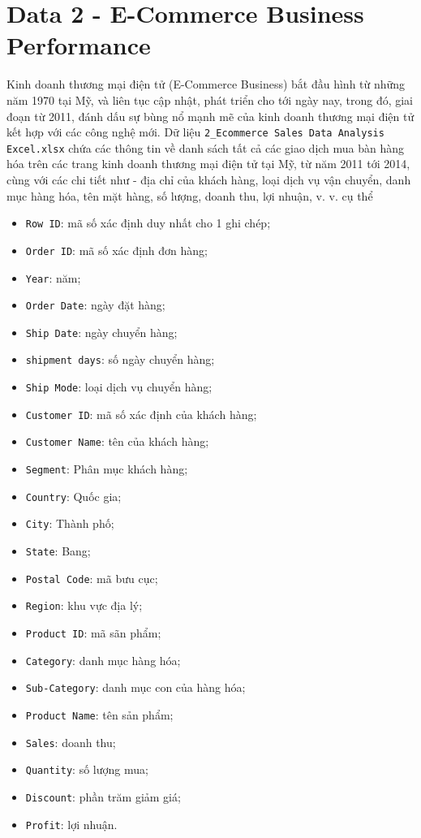 \documentclass[12pt]{article}
\theoremstyle{definition} \newtheorem{exercise}[theorem]{\bf Bài tập}
\begin{document}
\section*{Data 2 - E-Commerce Business Performance}
Kinh doanh thương mại điện tử (E-Commerce Business) bắt đầu hình từ những năm 1970 tại Mỹ, và liên tục cập nhật, phát triển cho tới ngày nay, trong đó, giai đoạn từ 2011, đánh dấu sự bùng nổ mạnh mẽ của kinh doanh thương mại điện tử kết hợp với các công nghệ mới. Dữ liệu \texttt{2\_Ecommerce Sales Data Analysis Excel.xlsx} chứa các thông tin về danh sách tất cả các giao dịch mua bàn hàng hóa trên các trang kinh doanh thương mại điện tử tại Mỹ, từ năm 2011 tới 2014, cùng với các chi tiết như - địa chỉ của khách hàng, loại dịch vụ vận chuyển, danh mục hàng hóa, tên mặt hàng, số lượng, doanh thu, lợi nhuận, v. v. cụ thể
\begin{itemize}
\item \texttt{Row ID}: mã số xác định duy nhất cho 1 ghi chép;
\item \texttt{Order ID}: mã số xác định đơn hàng;
\item \texttt{Year}: năm;
\item \texttt{Order Date}: ngày đặt hàng;
\item \texttt{Ship Date}: ngày chuyển hàng;
\item \texttt{shipment days}: số ngày chuyển hàng;
\item \texttt{Ship Mode}: loại dịch vụ chuyển hàng;
\item \texttt{Customer ID}: mã số xác định của khách hàng;
\item \texttt{Customer Name}: tên của khách hàng; 
\item \texttt{Segment}: Phân mục khách hàng;
\item \texttt{Country}: Quốc gia;
\item \texttt{City}: Thành phố;
\item \texttt{State}: Bang;
\item \texttt{Postal Code}: mã bưu cục;
\item \texttt{Region}: khu vực địa lý;
\item \texttt{Product ID}: mã sãn phẩm;
\item \texttt{Category}: danh mục hàng hóa;
\item \texttt{Sub-Category}: danh mục con của hàng hóa;
\item \texttt{Product Name}: tên sản phẩm;
\item \texttt{Sales}: doanh thu;
\item \texttt{Quantity}: số lượng mua;
\item \texttt{Discount}: phần trăm giảm giá;
\item \texttt{Profit}: lợi nhuận.
\end{itemize}
\end{document}
